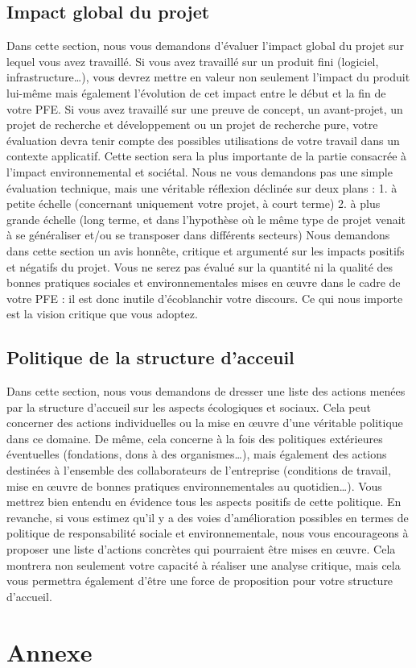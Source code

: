 \documentclass[12pt]{article}
\begin{document}
\subsection{Impact global du projet}
Dans cette section, nous vous demandons d’évaluer l’impact global du projet sur lequel vous avez travaillé. Si vous avez travaillé sur un produit fini (logiciel, infrastructure…), vous devrez mettre en valeur non seulement l’impact du produit lui-même mais également l’évolution de cet impact entre le début et la fin de votre PFE. Si vous avez travaillé sur une preuve de concept, un avant-projet, un projet de recherche et développement ou un projet de recherche pure, votre évaluation devra tenir compte des possibles utilisations de votre travail dans un contexte applicatif. Cette section sera la plus importante de la partie consacrée à l’impact environnemental et sociétal. Nous ne vous demandons pas une simple évaluation technique, mais une véritable réflexion déclinée sur deux plans :
1. à petite échelle (concernant uniquement votre projet, à court terme)
2. à plus grande échelle (long terme, et dans l’hypothèse où le même type de projet venait à se généraliser et/ou
se transposer dans différents secteurs)
Nous demandons dans cette section un avis honnête, critique et argumenté sur les impacts positifs et négatifs du projet. Vous ne serez pas évalué sur la quantité ni la qualité des bonnes pratiques sociales et environnementales mises en œuvre dans le cadre de votre PFE : il est donc inutile d’écoblanchir votre discours. Ce qui nous importe est la vision critique que vous adoptez.

\subsection{Politique de la structure d'acceuil}
Dans cette section, nous vous demandons de dresser une liste des actions menées par la structure d’accueil sur les aspects écologiques et sociaux. Cela peut concerner des actions individuelles ou la mise en œuvre d’une véritable politique dans ce domaine. De même, cela concerne à la fois des politiques extérieures éventuelles (fondations, dons à des organismes…), mais également des actions destinées à l’ensemble des collaborateurs de l’entreprise (conditions de travail, mise en œuvre de bonnes pratiques environnementales au quotidien…). Vous mettrez bien entendu en évidence tous les aspects positifs de cette politique. En revanche, si vous estimez qu’il y a des voies d’amélioration possibles en termes de politique de responsabilité sociale et environnementale, nous vous encourageons à proposer une liste d’actions concrètes qui pourraient être mises en œuvre. Cela montrera non seulement votre capacité à réaliser une analyse critique, mais cela vous permettra également d’être une force de proposition pour votre structure d’accueil.
\newpage
\section{Annexe}
\end{document}
